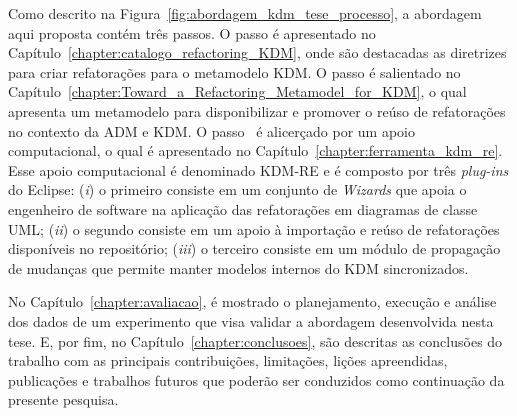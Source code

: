 Como descrito na Figura~\ref{fig:abordagem_kdm_tese_processo}, a abordagem aqui proposta contém três passos. O passo  é apresentado no Capítulo~\ref{chapter:catalogo_refactoring_KDM}, onde são destacadas as diretrizes para criar refatorações para o metamodelo KDM. O passo  é salientado no Capítulo~\ref{chapter:Toward_a_Refactoring_Metamodel_for_KDM}, o qual apresenta um metamodelo para disponibilizar e promover o reúso de refatorações no contexto da ADM e KDM. %
%
O passo~ é alicerçado por um apoio computacional, o qual é apresentado no Capítulo~\ref{chapter:ferramenta_kdm_re}. Esse apoio computacional é denominado KDM-RE e é composto por três \textit{plug-ins} do Eclipse: (\textit{i}) o primeiro consiste em um conjunto de \textit{Wizards} que apoia o engenheiro de software na aplicação das refatorações em diagramas de classe UML; (\textit{ii}) o segundo consiste em um apoio à importação e reúso de refatorações disponíveis no repositório; (\textit{iii}) o terceiro consiste em um módulo de propagação de mudanças que permite manter modelos internos do KDM sincronizados.


No Capítulo~\ref{chapter:avaliacao}, é mostrado o planejamento, execução e análise dos dados de um experimento que visa validar a abordagem desenvolvida nesta tese. E, por fim, no Capítulo~\ref{chapter:conclusoes}, são descritas as conclusões do trabalho com as principais contribuições, limitações, lições apreendidas, publicações e trabalhos futuros que poderão ser conduzidos como continuação da presente pesquisa.




